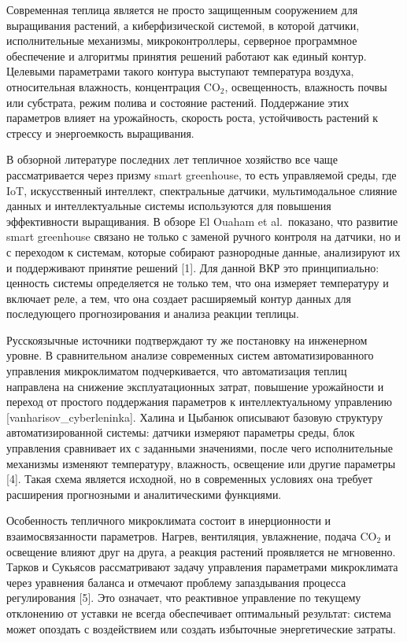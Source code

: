\documentclass[a4paper,14pt]{extarticle}
\begin{document}
Современная теплица является не просто защищенным сооружением для
выращивания растений, а киберфизической системой, в которой датчики,
исполнительные механизмы, микроконтроллеры, серверное программное
обеспечение и алгоритмы принятия решений работают как единый контур.
Целевыми параметрами такого контура выступают температура воздуха,
относительная влажность, концентрация CO\(_2\), освещенность, влажность
почвы или субстрата, режим полива и состояние растений. Поддержание этих
параметров влияет на урожайность, скорость роста, устойчивость растений
к стрессу и энергоемкость выращивания.

В обзорной литературе последних лет тепличное хозяйство все чаще
рассматривается через призму smart greenhouse, то есть управляемой
среды, где IoT, искусственный интеллект, спектральные датчики,
мультимодальное слияние данных и интеллектуальные системы используются
для повышения эффективности выращивания. В обзоре El Ouaham et
al.~показано, что развитие smart greenhouse связано не только с заменой
ручного контроля на датчики, но и с переходом к системам, которые
собирают разнородные данные, анализируют их и поддерживают принятие
решений {[}1{]}. Для данной ВКР это принципиально: ценность системы
определяется не только тем, что она измеряет температуру и включает
реле, а тем, что она создает расширяемый контур данных для последующего
прогнозирования и анализа реакции теплицы.

Русскоязычные источники подтверждают ту же постановку на инженерном
уровне. В сравнительном анализе современных систем автоматизированного
управления микроклиматом подчеркивается, что автоматизация теплиц
направлена на снижение эксплуатационных затрат, повышение урожайности и
переход от простого поддержания параметров к интеллектуальному
управлению {[}vanharisov\_cyberleninka{]}. Халина и Цыбанюк описывают
базовую структуру автоматизированной системы: датчики измеряют параметры
среды, блок управления сравнивает их с заданными значениями, после чего
исполнительные механизмы изменяют температуру, влажность, освещение или
другие параметры {[}4{]}. Такая схема является исходной, но в
современных условиях она требует расширения прогнозными и аналитическими
функциями.

Особенность тепличного микроклимата состоит в инерционности и
взаимосвязанности параметров. Нагрев, вентиляция, увлажнение, подача
CO\(_2\) и освещение влияют друг на друга, а реакция растений
проявляется не мгновенно. Тарков и Сукьясов рассматривают задачу
управления параметрами микроклимата через уравнения баланса и отмечают
проблему запаздывания процесса регулирования {[}5{]}. Это означает, что
реактивное управление по текущему отклонению от уставки не всегда
обеспечивает оптимальный результат: система может опоздать с
воздействием или создать избыточные энергетические затраты.
\end{document}
